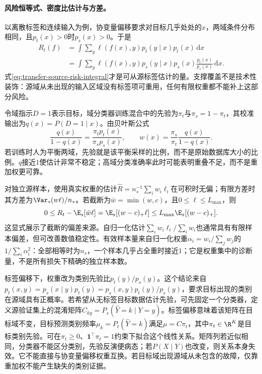 \paragraph{风险恒等式、密度比估计与方差。}
以离散标签和连续输入为例，协变量偏移要求对目标几乎处处的$x$，两域条件分布相同，且$p_t(x)>0$时$p_s(x)>0$。于是
\begin{align}
 R_t(f)&=\int\sum_y\ell(f(x),y)p_t(y\mid x)p_t(x)\,\mathrm dx\\
 &=\int\sum_y\ell(f(x),y)p_s(y\mid x)p_s(x)
 \frac{p_t(x)}{p_s(x)}\,\mathrm dx.\label{eq:transfer-source-risk-integral}
\end{align}
式\eqref{eq:transfer-source-risk-integral}才是可从源标签估计的量。支撑覆盖不是技术性装饰：源域从未出现的输入区域没有标签项可重用，任何有限权重都不能补上这部分风险。

令域指示$D=1$表示目标，域分类器训练混合中的先验为$\pi_t$与$\pi_s=1-\pi_t$，其校准输出为$q(x)=P(D=1\mid x)$。由贝叶斯公式
\begin{equation}
 \frac{q(x)}{1-q(x)}=\frac{\pi_t p_t(x)}{\pi_s p_s(x)},\qquad
 w(x)=\frac{\pi_s}{\pi_t}\frac{q(x)}{1-q(x)}.
\end{equation}
若训练时人为平衡两域，先验就是该平衡采样的比例，而不是原始数据库大小的比例。$q$接近$1$使估计非常不稳定；高域分类准确率此时可能表明重叠不足，而不是重加权更可靠。

对独立源样本，使用真实权重的估计$\widehat R=n_s^{-1}\sum_iw_i\ell_i$在可积时无偏；有限方差时其方差为$\Var_s(w\ell)/n_s$。若截断为$\bar w=\min(w,c)$，且$0\leq\ell\leq L_{\max}$，则
\begin{equation}
 0\leq R_t-\E_s[\bar w\ell]
 =\E_s[(w-c)_+\ell]\leq L_{\max}\E_s[(w-c)_+].
\end{equation}
这显式展示了截断的偏差来源。自归一化估计$\sum_iw_i\ell_i/\sum_iw_i$也通常具有有限样本偏差，但可改善数值稳定性。有效样本量来自归一化权重$\alpha_i=w_i/\sum_jw_j$的$1/\sum_i\alpha_i^2$：全部相等时为$n_s$，一个样本几乎占全重时接近$1$；它是权重集中的诊断量，不是所有损失下精确的独立样本数。

标签偏移下，权重改为类别先验比$p_t(y)/p_s(y)$。这个结论来自$p_t(x,y)=p_s(x\mid y)p_t(y)=p_s(x,y)p_t(y)/p_s(y)$，要求目标出现的类别在源域具有正概率。若希望从无标签目标数据估计先验，可先固定一个分类器，定义源验证集上的混淆矩阵$C_{ky}=P_s(\widehat Y=k\mid Y=y)$。标签偏移意味着该矩阵在目标域不变，目标预测类别频率$\mu_k=P_t(\widehat Y=k)$满足$\mu=C\pi_t$，其中$\pi_t\in\R^K$是目标类别先验。可在$\pi_t\geq0$、$\mathbf1^\top\pi_t=1$约束下拟合这个线性关系。矩阵列若近似相同，分类器不能区分类别，先验反演便病态；若$P(X\mid Y)$也改变，则关系本身失效。它不能直接与协变量偏移权重互换。若目标域出现源域从未包含的故障，仅靠重加权不能产生缺失的类别证据。

